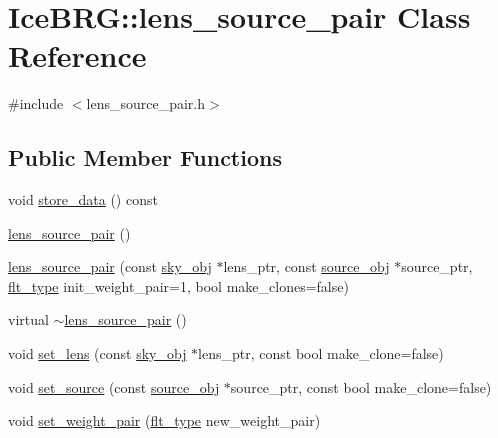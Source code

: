 \hypertarget{classIceBRG_1_1lens__source__pair}{\section{Ice\-B\-R\-G\-:\-:lens\-\_\-source\-\_\-pair Class Reference}
\label{classIceBRG_1_1lens__source__pair}
}


{\ttfamily \#include $<$lens\-\_\-source\-\_\-pair.\-h$>$}

\subsection*{Public Member Functions}
\begin{DoxyCompactItemize}
\item 
void \hyperlink{classIceBRG_1_1lens__source__pair_a922a24e5425d386cc94a00675723c34a}{store\-\_\-data} () const 
\item 
\hyperlink{classIceBRG_1_1lens__source__pair_ac645e063e02854ed96f79b53cccbb05e}{lens\-\_\-source\-\_\-pair} ()
\item 
\hyperlink{classIceBRG_1_1lens__source__pair_a495d0ad78258ad99e1a1606fcd2e862c}{lens\-\_\-source\-\_\-pair} (const \hyperlink{classIceBRG_1_1sky__obj}{sky\-\_\-obj} $\ast$lens\-\_\-ptr, const \hyperlink{classIceBRG_1_1source__obj}{source\-\_\-obj} $\ast$source\-\_\-ptr, \hyperlink{lib_2IceBRG__main_2common_8h_ad0f130a56eeb944d9ef2692ee881ecc4}{flt\-\_\-type} init\-\_\-weight\-\_\-pair=1, bool make\-\_\-clones=false)
\item 
virtual \hyperlink{classIceBRG_1_1lens__source__pair_a28127d9807cb756d7623662d9c2597a7}{$\sim$lens\-\_\-source\-\_\-pair} ()
\item 
void \hyperlink{classIceBRG_1_1lens__source__pair_ab4e86eb02371c806ca4692586e5a3316}{set\-\_\-lens} (const \hyperlink{classIceBRG_1_1sky__obj}{sky\-\_\-obj} $\ast$lens\-\_\-ptr, const bool make\-\_\-clone=false)
\item 
void \hyperlink{classIceBRG_1_1lens__source__pair_a1529e7fe0d45ac750fb0e1025ddd1c82}{set\-\_\-source} (const \hyperlink{classIceBRG_1_1source__obj}{source\-\_\-obj} $\ast$source\-\_\-ptr, const bool make\-\_\-clone=false)
\item 
void \hyperlink{classIceBRG_1_1lens__source__pair_af948d45a92d4142d6f6fb47c04af69fc}{set\-\_\-weight\-\_\-pair} (\hyperlink{lib_2IceBRG__main_2common_8h_ad0f130a56eeb944d9ef2692ee881ecc4}{flt\-\_\-type} new\-\_\-weight\-\_\-pair)
\item 

\end{DoxyCompactItemize}
